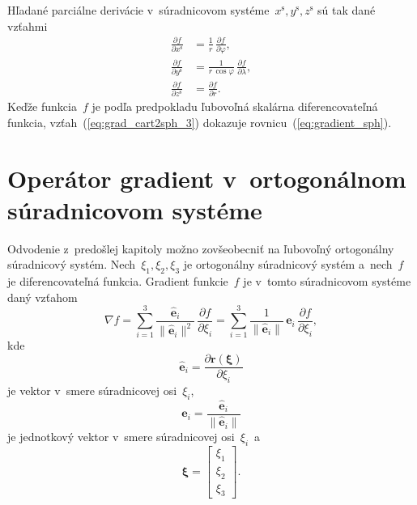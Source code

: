 \documentclass[a4paper, 12pt]{book}
\let\vec\mathbf
\begin{document}
%
Hľadané parciálne derivácie v~súradnicovom systéme~$x^\mathrm{s}, y^\mathrm{s}, 
z^\mathrm{s}$ sú tak dané vzťahmi
%
\begin{equation}
\label{eq:lnof_diff_oeprators}
\begin{split}
\frac{\partial f}{\partial x^\mathrm{s}} &= \frac{1}{r} \, \frac{\partial 
f}{\partial \varphi}{,}\\
%
\frac{\partial f}{\partial y^\mathrm{s}} &= \frac{1}{r \, \cos\varphi} \, 
\frac{\partial f}{\partial \lambda}{,}\\
%
\frac{\partial f}{\partial z^\mathrm{s}} &= \frac{\partial f}{\partial r}{.}
\end{split}
\end{equation}
%
Keďže funkcia~$f$ je podľa predpokladu ľubovoľná skalárna diferencovateľná 
funkcia, vzťah~(\ref{eq:grad_cart2sph_3}) dokazuje 
rovnicu~(\ref{eq:gradient_sph}).




\section{Operátor gradient v~ortogonálnom súradnicovom systéme}
\label{app:gradient_in_orthogonal_coordinates}

Odvodenie z~predošlej kapitoly možno zovšeobecniť na ľubovoľný ortogonálny 
súradnicový systém.  Nech~$\xi_1, \xi_2, \xi_3$ je ortogonálny súradnicový 
systém a~nech~$f$ je diferencovateľná funkcia.  Gradient funkcie~$f$ je v~tomto 
súradnicovom systéme daný vzťahom 
\parencite{Arfken2005,SansoGeoidDetermination}
%
\begin{equation}
\label{eq:grad_orthogonal_system}
\nabla f = \sum_{i = 1}^3 \frac{\hat{\vec e}_i}{\| \hat{\vec e}_i \|^2} \, 
\frac{\partial f}{\partial \xi_i} = \sum_{i = 1}^3 \frac{1}{\| \hat{\vec e}_i 
\|} \, \vec e_i \, \frac{\partial f}{\partial \xi_i}{,}
\end{equation}
%
kde
%
\begin{equation}
\label{eq:xi1xi2xi3_vectors}
\hat{\vec e}_i = \frac{\partial \vec r(\boldsymbol \xi)}{\partial \xi_i}
\end{equation}
%
je vektor v~smere súradnicovej osi~$\xi_i$,
%
\begin{equation}
\label{eq:xi1xi2xi3_unit_vectors}
\vec e_i = \frac{\hat{\vec e}_i}{\| \hat{\vec e}_i \|}
\end{equation}
%
je jednotkový vektor v~smere súradnicovej osi~$\xi_i$~a
%
\begin{equation}
\boldsymbol \xi =
%
\begin{bmatrix}
\xi_1\\
\xi_2\\
\xi_3
\end{bmatrix}
%
{.}
%
\end{equation}
\end{document}
